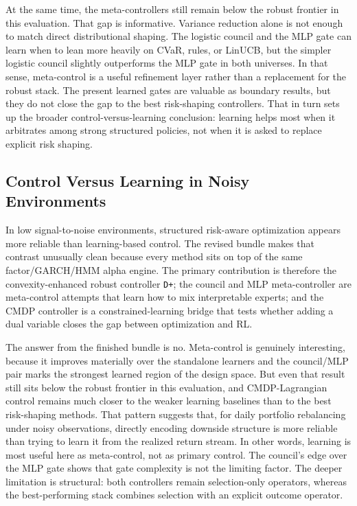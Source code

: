 \documentclass[10pt,twocolumn]{article}
\begin{document}
At the same time, the meta-controllers still remain below the robust frontier in this evaluation.
That gap is informative. Variance reduction alone is not enough to match direct
distributional shaping. The logistic council and the MLP gate can learn when to
lean more heavily on CVaR, rules, or LinUCB, but the simpler logistic council
slightly outperforms the MLP gate in both universes. In that sense,
meta-control is a useful refinement layer rather than a replacement for the
robust stack. The present learned gates are valuable as boundary results, but
they do not close the gap to the best risk-shaping controllers. That in turn
sets up the broader control-versus-learning conclusion: learning helps most
when it arbitrates among strong structured policies, not when it is asked to
replace explicit risk shaping.

\subsection{Control Versus Learning in Noisy Environments}

In low signal-to-noise environments, structured risk-aware optimization appears
more reliable than learning-based control. The revised bundle makes that
contrast unusually clean because every method sits on top of the same
factor/GARCH/HMM alpha engine. The primary contribution is therefore the
convexity-enhanced robust controller \texttt{D+}; the council and MLP
meta-controller are meta-control attempts that learn how to mix interpretable
experts; and the CMDP controller is a constrained-learning bridge that tests
whether adding a dual variable closes the gap between optimization and RL.

The answer from the finished bundle is no. Meta-control is genuinely
interesting, because it improves materially over the standalone learners and
the council/MLP pair marks the strongest learned region of the design space.
But even that result still sits below the robust frontier in this evaluation, and
CMDP-Lagrangian control remains much closer to the weaker learning baselines
than to the best risk-shaping methods. That pattern suggests that, for daily
portfolio rebalancing under noisy observations, directly encoding downside
structure is more reliable than trying to learn it from the realized return
stream. In other words, learning is most useful here as meta-control, not as
primary control. The council's edge over the MLP gate shows that gate
complexity is not the limiting factor. The deeper limitation is structural:
both controllers remain selection-only operators, whereas the best-performing
stack combines selection with an explicit outcome operator.
\end{document}
